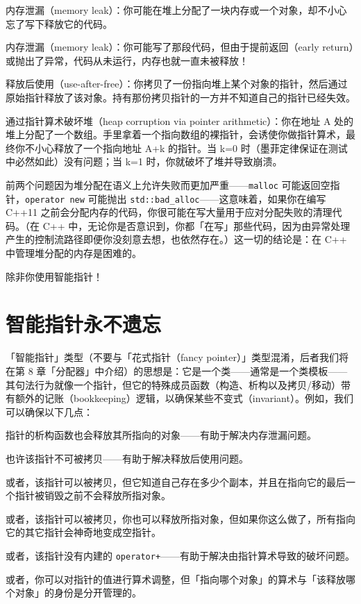 内存泄漏（memory leak）：你可能在堆上分配了一块内存或一个对象，却不小心忘了写下释放它的代码。

内存泄漏（memory leak）：你可能写了那段代码，但由于提前返回（early return）或抛出了异常，代码从未运行，内存也就一直未被释放！

释放后使用（use-after-free）：你拷贝了一份指向堆上某个对象的指针，然后通过原始指针释放了该对象。持有那份拷贝指针的一方并不知道自己的指针已经失效。

通过指针算术破坏堆（heap corruption via pointer arithmetic）：你在地址 A 处的堆上分配了一个数组。手里拿着一个指向数组的裸指针，会诱使你做指针算术，最终你不小心释放了一个指向地址 A+k 的指针。当 k=0 时（墨菲定律保证在测试中必然如此）没有问题；当 k=1 时，你就破坏了堆并导致崩溃。

前两个问题因为堆分配在语义上允许失败而更加严重——\texttt{malloc} 可能返回空指针，\texttt{operator new} 可能抛出 \texttt{std::\allowbreak{}bad\_\allowbreak{}alloc}——这意味着，如果你在编写 C++11 之前会分配内存的代码，你很可能在写大量用于应对分配失败的清理代码。（在 C++ 中，无论你是否意识到，你都「在写」那些代码，因为由异常处理产生的控制流路径即便你没刻意去想，也依然存在。）这一切的结论是：在 C++ 中管理堆分配的内存是困难的。

除非你使用智能指针！

\section{智能指针永不遗忘}

「智能指针」类型（不要与「花式指针（fancy pointer）」类型混淆，后者我们将在第 8 章「分配器」中介绍）的思想是：它是一个类——通常是一个类模板——其句法行为就像一个指针，但它的特殊成员函数（构造、析构以及拷贝/移动）带有额外的记账（bookkeeping）逻辑，以确保某些不变式（invariant）。例如，我们可以确保以下几点：

指针的析构函数也会释放其所指向的对象——有助于解决内存泄漏问题。

也许该指针不可被拷贝——有助于解决释放后使用问题。

或者，该指针可以被拷贝，但它知道自己存在多少个副本，并且在指向它的最后一个指针被销毁之前不会释放所指对象。

或者，该指针可以被拷贝，你也可以释放所指对象，但如果你这么做了，所有指向它的其它指针会神奇地变成空指针。

或者，该指针没有内建的 \texttt{operator+}——有助于解决由指针算术导致的破坏问题。

或者，你可以对指针的值进行算术调整，但「指向哪个对象」的算术与「该释放哪个对象」的身份是分开管理的。

